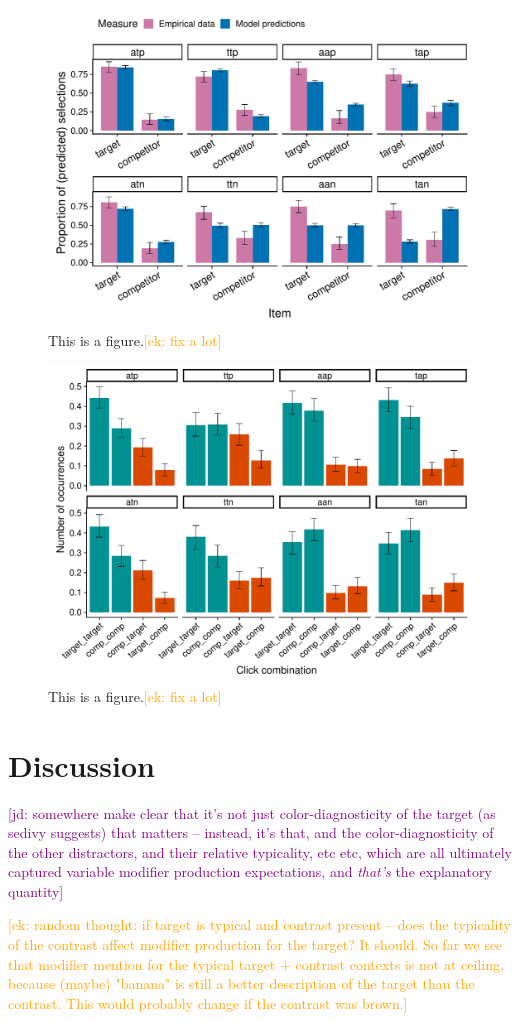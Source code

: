 \documentclass[10pt,letterpaper]{article}
\newcommand{\ek}[1]{\textcolor{Orange}{[ek: #1]}}
\newcommand{\jd}[1]{\textcolor{Purple}{[jd: #1]}}
\begin{document}
\begin{figure}
	\begin{center}
		\includegraphics[width=.475\textwidth]{graphs/modelflat-bycondition-targetprevClick.pdf}
	\end{center}
\caption{This is a figure.\ek{fix a lot}} 
\label{model-results-flatprior-targetprev}
\end{figure}

\begin{figure}
	\begin{center}
		\includegraphics[width=.475\textwidth]{graphs/switching-bycond.pdf}
	\end{center}
\caption{This is a figure.\ek{fix a lot}} 
\label{switching}
\end{figure}



\section{Discussion}

\jd{somewhere make clear that it's not just color-diagnosticity of the target (as sedivy suggests) that matters -- instead, it's that, and the color-diagnosticity of the other distractors, and their relative typicality, etc etc, which are all ultimately captured variable modifier production expectations, and \emph{that's} the explanatory quantity}

\ek{random thought: if target is typical and contrast present -- does the typicality of the contrast affect modifier production for the target? It should. So far we see that modifier mention for the typical target + contrast contexts is not at ceiling, because (maybe) "banana" is still a better description of the target than the contrast. This would probably change if the contrast was brown.}
\end{document}
